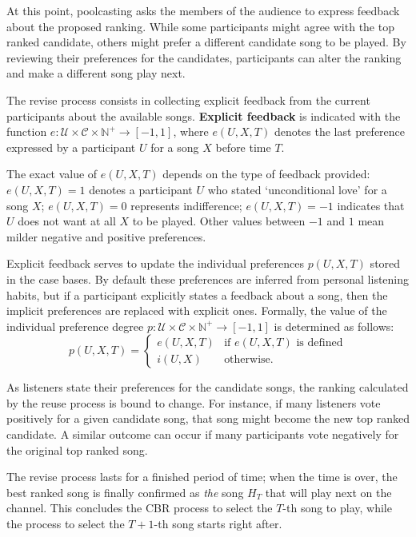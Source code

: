 At this point, poolcasting asks the members of the audience to express feedback about the proposed ranking.
While some participants might agree with the top ranked candidate, others might prefer a different candidate song to be played.
By reviewing their preferences for the candidates, participants can alter the ranking and make a different song play next.

The revise process consists in collecting explicit feedback from the current participants about the available songs. 
\textbf{Explicit feedback} is indicated with the function $e: \mathcal{U} \times \mathcal{C} \times \mathbb{N}^+ \to [-1,1]$, where $e(U,X,T)$ denotes the last preference expressed by a participant $U$ for a song $X$ before time $T$.

The exact value of $e(U,X,T)$ depends on the type of feedback provided: $e(U,X,T) = 1$ denotes a participant $U$ who stated `unconditional love' for a song $X$; $e(U,X,T) = 0$ represents indifference; $e(U,X,T) = -1$ indicates that $U$ does not want at all $X$ to be played. 
Other values between $-1$ and $1$ mean milder negative and positive preferences. 

Explicit feedback serves to update the individual preferences $p(U,X,T)$ stored in the case bases. 
By default these preferences are inferred from personal listening habits, but if a participant explicitly states a feedback about a song, then the implicit preferences are replaced with explicit ones. 
Formally, the value of the individual preference degree $p: \mathcal{U} \times \mathcal{C} \times \mathbb{N}^+ \to [-1,1]$ is determined as follows:
\begin{equation}
\label{eq:preference_model2}
p(U,X,T) = 
\begin{cases}
e(U,X,T) & \text{if $e(U,X,T)$ is defined}\\        
i(U,X) & \text{otherwise.}
\end{cases}
\end{equation}

As listeners state their preferences for the candidate songs, the ranking calculated by the reuse process is bound to change. 
For instance, if many listeners vote positively for a given candidate song, that song might become the new top ranked candidate.
A similar outcome can occur if many participants vote negatively for the original top ranked song.

The revise process lasts for a finished period of time;
when the time is over, the best ranked song is finally confirmed as \emph{the} song $H_T$ that will play next on the channel. 
This concludes the CBR process to select the $T$-th song to play, while the process to select the $T + 1$-th song starts right after.

